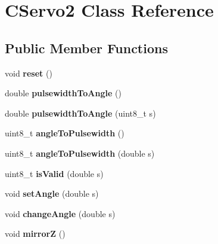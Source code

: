 \hypertarget{class_c_servo2}{
\section{CServo2 Class Reference}
\label{class_c_servo2}
}
\subsection*{Public Member Functions}
\begin{DoxyCompactItemize}
\item 
\hypertarget{class_c_servo2_aa266705a8602cc307b508dd97734aa71}{
void {\bfseries reset} ()}
\label{class_c_servo2_aa266705a8602cc307b508dd97734aa71}

\item 
\hypertarget{class_c_servo2_a3e6f977c73ad5842fffb7d04f7b0d941}{
double {\bfseries pulsewidthToAngle} ()}
\label{class_c_servo2_a3e6f977c73ad5842fffb7d04f7b0d941}

\item 
\hypertarget{class_c_servo2_a40a6384251bb2b9c06fa6453477a8ff1}{
double {\bfseries pulsewidthToAngle} (uint8\_\-t s)}
\label{class_c_servo2_a40a6384251bb2b9c06fa6453477a8ff1}

\item 
\hypertarget{class_c_servo2_a698be98ec12750cb1d52c632ae4cb443}{
uint8\_\-t {\bfseries angleToPulsewidth} ()}
\label{class_c_servo2_a698be98ec12750cb1d52c632ae4cb443}

\item 
\hypertarget{class_c_servo2_a2c37b767d47aead842cc7eb2144820a4}{
uint8\_\-t {\bfseries angleToPulsewidth} (double s)}
\label{class_c_servo2_a2c37b767d47aead842cc7eb2144820a4}

\item 
\hypertarget{class_c_servo2_a1dd315d9bdb7d9a095af6660cb2be710}{
uint8\_\-t {\bfseries isValid} (double s)}
\label{class_c_servo2_a1dd315d9bdb7d9a095af6660cb2be710}

\item 
\hypertarget{class_c_servo2_a0fe2be79d12ff2fa254900125884eb4c}{
void {\bfseries setAngle} (double s)}
\label{class_c_servo2_a0fe2be79d12ff2fa254900125884eb4c}

\item 
\hypertarget{class_c_servo2_a60b06aeebf5966359dcbdcd9b491c68c}{
void {\bfseries changeAngle} (double s)}
\label{class_c_servo2_a60b06aeebf5966359dcbdcd9b491c68c}

\item 
\hypertarget{class_c_servo2_a994b648f9dc7e04008d6a0248722202e}{
void {\bfseries mirrorZ} ()}
\label{class_c_servo2_a994b648f9dc7e04008d6a0248722202e}


\end{DoxyCompactItemize}
